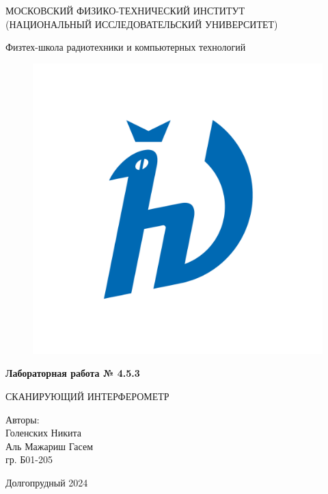 
\usepackage{wrapfig}
\usepackage{graphicx}
\usepackage{mathtext}
\usepackage{amsmath}
\usepackage{siunitx} %
\usepackage{multirow}
\usepackage{rotating}
\usepackage{afterpage}
\usepackage[T1,T2A]{fontenc}
\usepackage[russian]{babel}
\usepackage{caption}
\usepackage[arrowdel]{physics}
\usepackage{booktabs}
\usepackage{lscape}



\begin{titlepage}
    \begin{center}
    
    \Large МОСКОВСКИЙ ФИЗИКО-ТЕХНИЧЕСКИЙ ИНСТИТУТ \\ (НАЦИОНАЛЬНЫЙ ИССЛЕДОВАТЕЛЬСКИЙ УНИВЕРСИТЕТ)
    \vspace{0.3cm}
    
    \Large Физтех-школа радиотехники и компьютерных технологий
    \vspace{1cm}

  \begin{figure}[h]
    \centering
    \includegraphics[width=0.5\linewidth]{logo.png}
    \label{fig:mpr} 
  \end{figure}

    \Huge {\bfseries Лабораторная работа № 4.5.3} 
    
СКАНИРУЮЩИЙ ИНТЕРФЕРОМЕТР

    \vspace{1cm}
    
    \begin{flushright}
{\LARGE Авторы:\\ Голенских Никита \\ Аль Мажариш Гасем \\ гр. Б01-205}
\end{flushright}
    
    \vspace{\fill}
    \Large Долгопрудный 2024
    
    \end{center}
    \end{titlepage}

